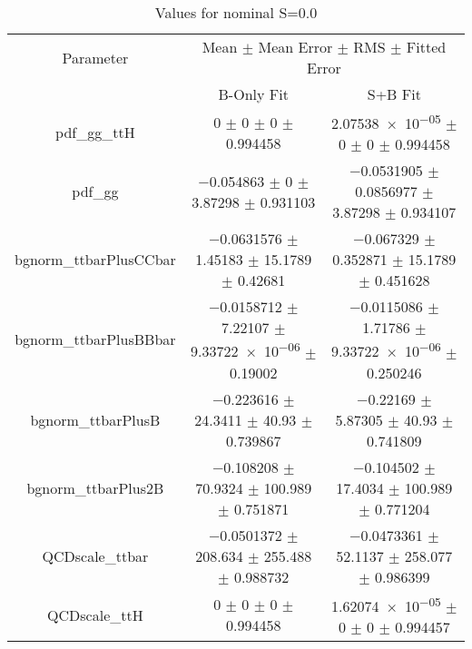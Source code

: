 \begin{table}
\centering
\caption{Values for nominal S=0.0}
\begin{tabular}{ccc}
\toprule
Parameter & \multicolumn{2}{c}{Mean $\pm$ Mean Error $\pm$ RMS $\pm$ Fitted Error}\\
 & B-Only Fit & S+B Fit\\
\midrule
pdf\_gg\_ttH & \num{0} $\pm$ \num{0} $\pm$ \num{0} $\pm$ \num{0.994458} & \num{2.07538e-05} $\pm$ \num{0} $\pm$ \num{0} $\pm$ \num{0.994458}\\
pdf\_gg & \num{-0.054863} $\pm$ \num{0} $\pm$ \num{3.87298} $\pm$ \num{0.931103} & \num{-0.0531905} $\pm$ \num{0.0856977} $\pm$ \num{3.87298} $\pm$ \num{0.934107}\\
bgnorm\_ttbarPlusCCbar & \num{-0.0631576} $\pm$ \num{1.45183} $\pm$ \num{15.1789} $\pm$ \num{0.42681} & \num{-0.067329} $\pm$ \num{0.352871} $\pm$ \num{15.1789} $\pm$ \num{0.451628}\\
bgnorm\_ttbarPlusBBbar & \num{-0.0158712} $\pm$ \num{7.22107} $\pm$ \num{9.33722e-06} $\pm$ \num{0.19002} & \num{-0.0115086} $\pm$ \num{1.71786} $\pm$ \num{9.33722e-06} $\pm$ \num{0.250246}\\
bgnorm\_ttbarPlusB & \num{-0.223616} $\pm$ \num{24.3411} $\pm$ \num{40.93} $\pm$ \num{0.739867} & \num{-0.22169} $\pm$ \num{5.87305} $\pm$ \num{40.93} $\pm$ \num{0.741809}\\
bgnorm\_ttbarPlus2B & \num{-0.108208} $\pm$ \num{70.9324} $\pm$ \num{100.989} $\pm$ \num{0.751871} & \num{-0.104502} $\pm$ \num{17.4034} $\pm$ \num{100.989} $\pm$ \num{0.771204}\\
QCDscale\_ttbar & \num{-0.0501372} $\pm$ \num{208.634} $\pm$ \num{255.488} $\pm$ \num{0.988732} & \num{-0.0473361} $\pm$ \num{52.1137} $\pm$ \num{258.077} $\pm$ \num{0.986399}\\
QCDscale\_ttH & \num{0} $\pm$ \num{0} $\pm$ \num{0} $\pm$ \num{0.994458} & \num{1.62074e-05} $\pm$ \num{0} $\pm$ \num{0} $\pm$ \num{0.994457}\\
\bottomrule
\end{tabular}
\end{table}